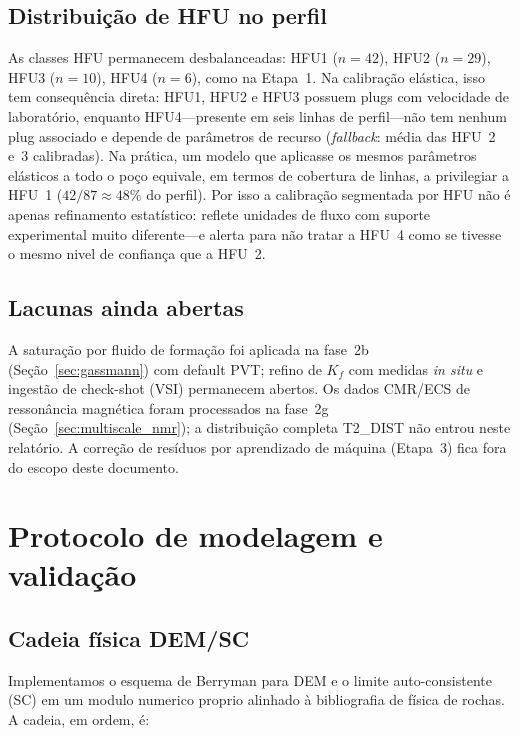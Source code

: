 \documentclass[11pt,a4paper]{article}
\numberwithin{equation}{section}
\begin{document}
\subsection{Distribuição de HFU no perfil}

As classes HFU permanecem desbalanceadas: HFU1 ($n=42$), HFU2 ($n=29$),
HFU3 ($n=10$), HFU4 ($n=6$), como na Etapa~1.
Na calibração elástica, isso tem consequência direta: HFU1, HFU2 e
HFU3 possuem plugs com velocidade de laboratório, enquanto HFU4---presente
em seis linhas de perfil---não tem nenhum plug associado e depende de
parâmetros de recurso (\emph{fallback}: média das HFU~2 e~3 calibradas).
Na prática, um modelo que aplicasse os mesmos parâmetros elásticos a todo o poço
equivale, em termos de cobertura de linhas, a privilegiar a HFU~1
($42/87 \approx 48\%$ do perfil).
Por isso a calibração segmentada por HFU não é apenas refinamento
estatístico: reflete unidades de fluxo com suporte experimental muito
diferente---e alerta para não tratar a HFU~4 como se tivesse o mesmo nivel
de confiança que a HFU~2.

\subsection{Lacunas ainda abertas}

A saturação por fluido de formação foi aplicada na fase~2b
(Seção~\ref{sec:gassmann}) com default PVT; refino de $K_f$ com medidas
\emph{in situ} e ingestão de check-shot (VSI) permanecem abertos.
Os dados CMR/ECS de ressonância magnética foram processados na fase~2g
(Seção~\ref{sec:multiscale_nmr}); a distribuição completa T2\_DIST não entrou
neste relatório.
A correção de resíduos por aprendizado de máquina (Etapa~3) fica fora do
escopo deste documento.

\section{Protocolo de modelagem e validação}
\label{sec:protocolo}

\subsection{Cadeia física DEM/SC}

Implementamos o esquema de Berryman para DEM e o limite auto-consistente (SC)
em um modulo numerico proprio alinhado à bibliografia de física de rochas.
A cadeia, em ordem, é:
\end{document}
